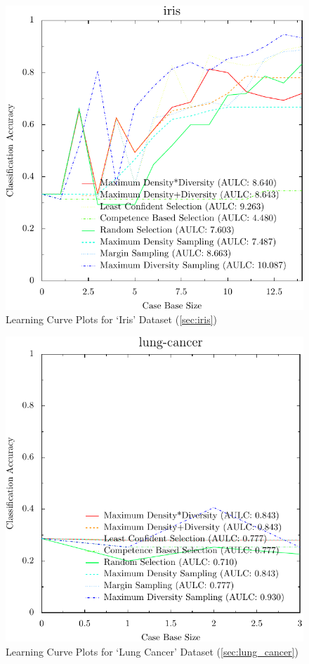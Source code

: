 \documentclass[a4paper,11pt]{report}
\begin{document}
\begin{figure}[h!]
\includegraphics{./Plots/iris}
\caption{Learning Curve Plots for `Iris' Dataset (\ref{sec:iris})}
\end{figure}

\begin{figure}[h!]
\includegraphics{./Plots/lung-cancer}
\caption{Learning Curve Plots for `Lung Cancer' Dataset (\ref{sec:lung_cancer})}
\end{figure}
\end{document}
